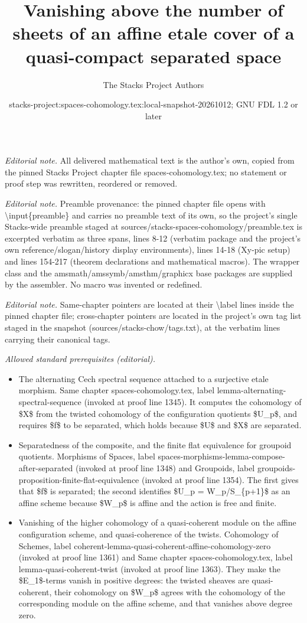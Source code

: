 \documentclass[10pt,a4paper]{amsart}
\title{Vanishing above the number of sheets of an affine etale cover of a quasi-compact separated space}
\author{The Stacks Project Authors}
\date{stacks-project:spaces-cohomology.tex:local-snapshot-20261012; GNU FDL 1.2 or later}
\theoremstyle{plain}
\theoremstyle{definition}
\theoremstyle{remark}
\numberwithin{equation}{subsection}
\begin{document}
\maketitle
\noindent\textit{Editorial note.} All delivered mathematical text is the author's own, copied from the pinned Stacks Project chapter file spaces-cohomology.tex; no statement or proof step was rewritten, reordered or removed.\par\medskip
\noindent\textit{Editorial note.} Preamble provenance: the pinned chapter file opens with \textbackslash{}input\{preamble\} and carries no preamble text of its own, so the project's single Stacks-wide preamble staged at sources/stacks-spaces-cohomology/preamble.tex is excerpted verbatim as three spans, lines 8-12 (verbatim package and the project's own reference/slogan/history display environments), lines 14-18 (Xy-pic setup) and lines 154-217 (theorem declarations and mathematical macros). The wrapper class and the amsmath/amssymb/amsthm/graphicx base packages are supplied by the assembler. No macro was invented or redefined.\par\medskip
\noindent\textit{Editorial note.} Same-chapter pointers are located at their \textbackslash{}label lines inside the pinned chapter file; cross-chapter pointers are located in the project's own tag list staged in the snapshot (sources/stacks-chow/tags.txt), at the verbatim lines carrying their canonical tags.\par\medskip
\noindent\textit{Allowed standard prerequisites (editorial).}\begin{itemize}
\item The alternating Cech spectral sequence attached to a surjective etale morphism. Same chapter spaces-cohomology.tex, label lemma-alternating-spectral-sequence (invoked at proof line 1345). It computes the cohomology of \$X\$ from the twisted cohomology of the configuration quotients \$U\_p\$, and requires \$f\$ to be separated, which holds because \$U\$ and \$X\$ are separated.
\item Separatedness of the composite, and the finite flat equivalence for groupoid quotients. Morphisms of Spaces, label spaces-morphisms-lemma-compose-after-separated (invoked at proof line 1348) and Groupoids, label groupoids-proposition-finite-flat-equivalence (invoked at proof line 1354). The first gives that \$f\$ is separated; the second identifies \$U\_p = W\_p/S\_\{p+1\}\$ as an affine scheme because \$W\_p\$ is affine and the action is free and finite.
\item Vanishing of the higher cohomology of a quasi-coherent module on the affine configuration scheme, and quasi-coherence of the twists. Cohomology of Schemes, label coherent-lemma-quasi-coherent-affine-cohomology-zero (invoked at proof line 1361) and Same chapter spaces-cohomology.tex, label lemma-quasi-coherent-twist (invoked at proof line 1363). They make the \$E\_1\$-terms vanish in positive degrees: the twisted sheaves are quasi-coherent, their cohomology on \$W\_p\$ agrees with the cohomology of the corresponding module on the affine scheme, and that vanishes above degree zero.
\end{itemize}\medskip
\end{document}
